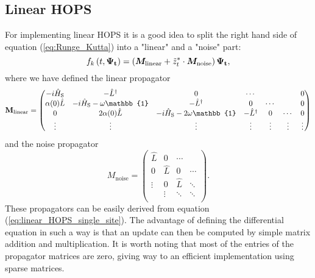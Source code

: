 \subsection*{Linear HOPS}
For implementing linear HOPS it is a good idea to split the right hand side of equation (\ref{eq:Runge_Kutta}) into a "linear" and a "noise" part:
\begin{equation}
    f_k\left(t, \vb{\Psi_t}\right) = \left(\vb*{M_\text{linear}} + \tilde{z}_t^* \cdot \vb*{M_\text{noise}} \right) \vb{\Psi_t},
\end{equation}
where we have defined the linear propagator
\begin{equation*}
    \vb{M_\text{linear}} =
    \begin{pmatrix}
        -i\hat{H}_\text{S} & -\hat{L}^\dagger                    & 0                                     & \cdots           &        &        & 0 \\
        \alpha(0)\hat{L}   & -i\hat{H}_\text{S}-\omega\mathbb{1} & -\hat{L}^{\dagger}                    & 0                & \cdots &        & 0 \\
        0                  & 2\alpha(0)\hat{L}                   & -i\hat{H}_\text{S}-2\omega\mathbb{1}  & -\hat{L}^\dagger & 0      & \cdots & 0 \\
        \vdots             & \vdots                              & \vdots                                & \vdots           & \vdots & \vdots & \vdots \\
    \end{pmatrix}
\end{equation*}
and the noise propagator
\begin{equation*}
    M_\text{noise} =
    \begin{pmatrix}
        \hat{L} & 0       & \cdots  &        \\
        0       & \hat{L} & 0       & \cdots \\
        \vdots  & 0       & \hat{L} & \ddots \\
                & \vdots  & \ddots  & \ddots \\
    \end{pmatrix}.
\end{equation*}
These propagators can be easily derived from equation (\ref{eq:linear_HOPS_single_site}).
The advantage of defining the differential equation in such a way is that an update can then be computed by simple matrix
addition and multiplication. It is worth noting that most of the entries of the propagator matrices are zero, giving way
to an efficient implementation using sparse matrices.

